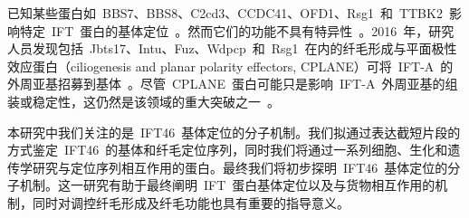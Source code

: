 已知某些蛋白如\ BBS7、BBS8、C2cd3、CCDC41、OFD1、Rsg1\ 和\ TTBK2\ 影响特定\ IFT\ 蛋白的基体定位\ \citep{Blacque2004,Brooks2013,Goetz2012,Joo2013,Ye2014}。然而它们的功能不具有特异性\ \citep{Toriyama2016}。2016\ 年，研究人员发现包括\ Jbts17、Intu、Fuz、Wdpcp\ 和\ Rsg1\ 在内的纤毛形成与平面极性效应蛋白（ciliogenesis and planar polarity effectors, CPLANE）可将\ IFT-A\ 的外周亚基招募到基体\ \citep{Brooks2012,Toriyama2016}。尽管\ CPLANE\ 蛋白可能只是影响\ IFT-A\ 外周亚基的组装或稳定性，这仍然是该领域的重大突破之一\ \citep{Toriyama2016}。

本研究中我们关注的是\ IFT46\ 基体定位的分子机制。我们拟通过表达截短片段的方式鉴定\ IFT46\ 的基体和纤毛定位序列，同时我们将通过一系列细胞、生化和遗传学研究与定位序列相互作用的蛋白。最终我们将初步探明\ IFT46\ 基体定位的分子机制。这一研究有助于最终阐明\ IFT\ 蛋白基体定位以及与货物相互作用的机制，同时对调控纤毛形成及纤毛功能也具有重要的指导意义。



